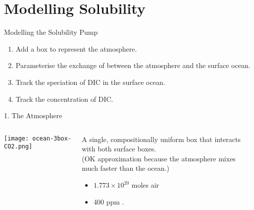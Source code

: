 \documentclass[aspectratio=169]{beamer}
\begin{document}
\section{Modelling Solubility}

\begin{frame}{Modelling the Solubility Pump}

\begin{enumerate}
    \item Add a box to represent the atmosphere.
    \item Parameterise the exchange of  between the atmosphere and the surface ocean.
    \item Track the speciation of DIC in the surface ocean.
    \item Track the concentration of DIC.
\end{enumerate}

\end{frame}


\begin{frame}{1. The Atmosphere}

    \begin{columns}
        \begin{column}{0.6\linewidth}
            \texttt{[image: ocean-3box-CO2.png]}
        \end{column}   
        \begin{column}{0.35\linewidth}
            A single, compositionally uniform box that interacts with both surface boxes. \\
            \tiny (OK approximation because the atmosphere mixes much faster than the ocean.) 
            
            \normalsize\bigskip
            \begin{itemize}
                \item $1.773 \times 10^{20}$ moles air
                \item 400 ppm .
            \end{itemize}
        \end{column} 
    \end{columns}
    
\end{frame}
\end{document}
